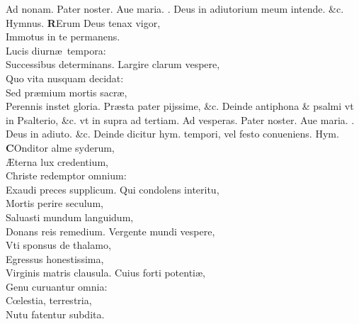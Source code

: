 \documentclass[a5paper,10pt]{book}
\makeatletter
\DeclareRobustCommand{\Vbar}{\vers@resp{-0.1em}{V}}
\newcommand{\vers@resp@sym}{\raisebox{0.2ex}{\rotatebox[origin=c]{-20}{$\m@th\rceil$}}}
\newcommand{\vers@resp}[2]{%
  {\ooalign{\hidewidth\kern#1\vers@resp@sym\hidewidth\cr#2\cr}}%
}%
\def\ae{æ}
\def\AE{Æ}
\def\oe{œ}
\makeatother
\begin{document}
\begin{multicols*}{2}
\newline {} \color{red} Ad \hypertarget{DOM-PRIMA-ADV-NON}{nonam.} \color{black}
Pater noster. Aue maria. \color{red} \Vbar . \color{black} Deus in adiutorium meum intende. \&c. \quad \color{red} Hymnus. \color{black}
\vspace{-.25em}
\lettrine[lines=2]{\bfseries \color{red} R}{}Erum Deus tenax vigor,\\Immotus in te permanens.\\Lucis diurn\ae \ tempora:\\Successibus determinans.
\newline \color{red} L\color{black}argire clarum vespere,\\Quo vita nusquam decidat:\\Sed pr\ae mium mortis sacr\ae ,\\Perennis instet gloria.
\newline \color{red} P\color{black}r\ae sta pater pijssime, \&c.
\newline \color{red} Deinde antiphona \& psalmi vt in Psalterio, \&c. vt in supra ad tertiam. \color{black}
\newline {} \color{red} Ad \hypertarget{DOM-PRIMA-ADV-VES}{vesperas.} \color{black}
Pater noster. Aue maria. \color{red} \Vbar . \color{black} Deus in adiuto. \&c. \color{black}
\newline {} \color{red} Deinde dicitur hym. tempori, vel festo conueniens. Hym. \color{black}
\vspace{-.25em}
\lettrine[lines=2]{\bfseries \color{red} C}{}Onditor alme syderum,\\ \AE terna lux credentium,\\Christe redemptor omnium:\\Exaudi preces supplicum.
\newline \color{red} Q\color{black}ui condolens interitu,\\Mortis perire seculum,\\Saluasti mundum languidum,\\Donans reis remedium.
\newline \color{red} V\color{black}ergente mundi vespere,\\Vti sponsus de thalamo,\\Egressus honestissima,\\Virginis matris clausula.
\newline \color{red} C\color{black}uius forti potenti\ae ,\\Genu curuantur omnia:\\C\oe lestia, terrestria,\\Nutu fatentur subdita.

\end{multicols*}
\end{document}
